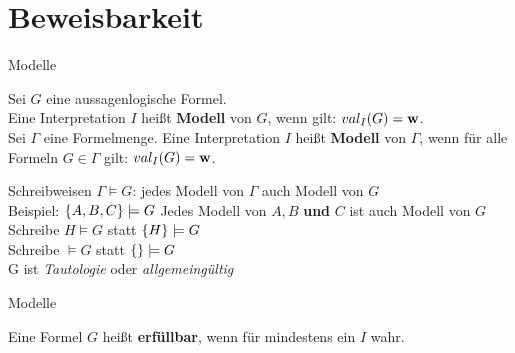 \section{Beweisbarkeit}

\begin{frame}{Modelle}
	\begin{Definition}
		Sei $G$ eine aussagenlogische Formel. \\
		Eine Interpretation $I$ heißt \textbf{Modell} von $G$, wenn gilt: \quad $val_I(G) = \hbox{\textbf{w}}$. \\
		\pause
		\medskip
		Sei $\Gamma$ eine Formelmenge.
		Eine Interpretation $I$ heißt \textbf{Modell} von $\Gamma$, wenn für alle Formeln $G \in  \Gamma$ gilt: \quad $val_I(G) = \hbox{\textbf{w}}$.
	\end{Definition}
	\pause
	\begin{block}{Schreibweisen}
		$\Gamma \models G$: jedes Modell von $\Gamma$ auch Modell von $G$ \\
		Beispiel: \quad $\left\{A,B,C\right\} \models G$ \quad Jedes Modell von $A, B$ \textbf{und} $C$ ist auch Modell von $G$ \\
		\medskip
		Schreibe $H \models G$ statt $\left\{H\right\} \models G$ \\
		\medskip
		Schreibe $\models G$ statt $\left\{\right\} \models G$ \\
		\impl G ist \emph{Tautologie} oder \emph{allgemeingültig} 
	\end{block}
\end{frame}

\begin{frame}{Modelle}
	\begin{Definition}
		Eine Formel $G$ heißt \textbf{erfüllbar}, wenn für mindestens ein $I$ wahr. \\
		
	\end{Definition}
\end{frame}

